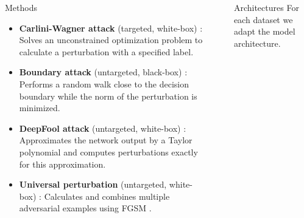\documentclass[final]{beamer}
\newlength{\sepwid}
\newlength{\onecolwid}
\newlength{\twocolwid}
\begin{document}
\begin{frame}[t]
\begin{columns}[t]
\begin{column}{\onecolwid}
			\begin{block}{Methods}
				\begin{itemize}
					\item \textbf{Carlini-Wagner attack} (targeted, white-box) \cite{carlini}: Solves an unconstrained optimization problem to calculate a perturbation with a specified label.
					\item \textbf{Boundary attack} (untargeted, black-box) \cite{boundary}: Performs a random walk close to the
					decision boundary while the norm of the perturbation is minimized.
					\item \textbf{DeepFool attack} (untargeted, white-box) \cite{deepfool}: Approximates the network output by a Taylor polynomial and computes perturbations exactly for this approximation.
					\item \textbf{Universal perturbation} (untargeted, white-box) \cite{universal}: Calculates and combines multiple adversarial examples using FGSM \cite{fgsm}.
				\end{itemize}
			\end{block}
			
			
			
		\end{column} %
		
		\begin{column}{\sepwid}\end{column} %
		
		\begin{column}{\twocolwid} %
			
			\begin{columns}[t,totalwidth=\twocolwid] %
				
				\begin{column}{\onecolwid}\vspace{-.6in} %
					
					
					\begin{block}{Architectures}
						For each dataset we adapt the model architecture.
						\vspace{1cm}
						

\end{block}
\end{column}
\end{columns}
\end{column}
\end{columns}
\end{frame}
\end{document}
